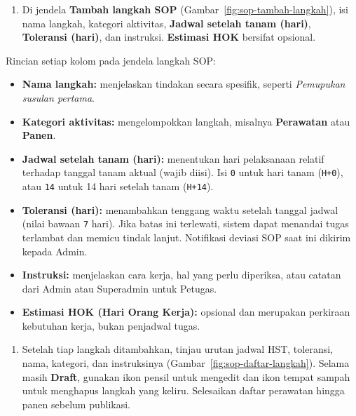 
\begin{enumerate}[resume=admin-sop]
  \item Di jendela \textbf{Tambah langkah SOP} (Gambar~\ref{fig:sop-tambah-langkah}), isi nama langkah, kategori aktivitas, \textbf{Jadwal setelah tanam (hari)}, \textbf{Toleransi (hari)}, dan instruksi. \textbf{Estimasi HOK} bersifat opsional.
\end{enumerate}


Rincian setiap kolom pada jendela langkah SOP:
\begin{itemize}
  \item \textbf{Nama langkah:} menjelaskan tindakan secara spesifik, seperti \emph{Pemupukan susulan pertama}.
  \item \textbf{Kategori aktivitas:} mengelompokkan langkah, misalnya \textbf{Perawatan} atau \textbf{Panen}.
  \item \textbf{Jadwal setelah tanam (hari):} menentukan hari pelaksanaan relatif terhadap tanggal tanam aktual (wajib diisi). Isi \texttt{0} untuk hari tanam (\texttt{H+0}), atau \texttt{14} untuk 14 hari setelah tanam (\texttt{H+14}).
  \item \textbf{Toleransi (hari):} menambahkan tenggang waktu setelah tanggal jadwal (nilai bawaan \texttt{7} hari). Jika batas ini terlewati, sistem dapat menandai tugas terlambat dan memicu tindak lanjut. Notifikasi deviasi SOP saat ini dikirim kepada Admin.
  \item \textbf{Instruksi:} menjelaskan cara kerja, hal yang perlu diperiksa, atau catatan dari Admin atau Superadmin untuk Petugas.
  \item \textbf{Estimasi HOK (Hari Orang Kerja):} opsional dan merupakan perkiraan kebutuhan kerja, bukan penjadwal tugas.
\end{itemize}

\begin{enumerate}[resume=admin-sop]
  \item Setelah tiap langkah ditambahkan, tinjau urutan jadwal HST, toleransi, nama, kategori, dan instruksinya (Gambar~\ref{fig:sop-daftar-langkah}). Selama masih \textbf{Draft}, gunakan ikon pensil untuk mengedit dan ikon tempat sampah untuk menghapus langkah yang keliru. Selesaikan daftar perawatan hingga panen sebelum publikasi.
\end{enumerate}


